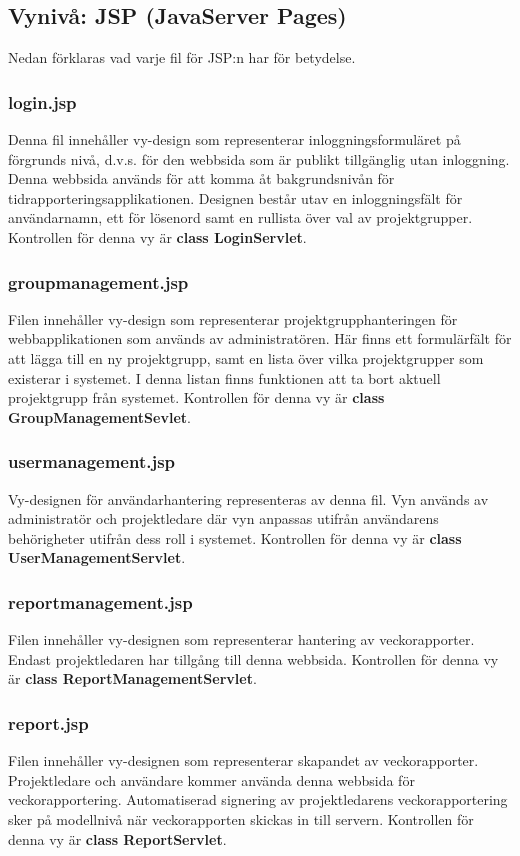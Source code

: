\documentclass[paper=a4, fontsize=11pt,twoside]{article}
\begin{document}
\subsection{Vynivå: JSP (JavaServer Pages)}
Nedan förklaras vad varje fil för JSP:n har för betydelse.
\subsubsection{login.jsp}
Denna fil innehåller vy-design som representerar inloggningsformuläret på förgrunds nivå, d.v.s. för den webbsida som är 		publikt tillgänglig utan inloggning. Denna webbsida används för att komma åt bakgrundsnivån för tidrapporteringsapplikationen. Designen består utav en inloggningsfält för användarnamn, ett för lösenord samt en rullista över val av projektgrupper. Kontrollen för denna vy är \textbf{class LoginServlet}.

\subsubsection{groupmanagement.jsp}
Filen innehåller vy-design som representerar projektgrupphanteringen för webbapplikationen som används av administratören. Här finns ett formulärfält för att lägga till en ny projektgrupp, samt en lista över vilka projektgrupper som existerar  i systemet. I denna listan finns funktionen att ta bort aktuell projektgrupp från systemet. Kontrollen för denna vy är \textbf{class GroupManagementSevlet}.

\subsubsection{usermanagement.jsp}
Vy-designen för användarhantering representeras av denna fil. Vyn används av administratör och projektledare där vyn anpassas utifrån användarens behörigheter utifrån dess roll i systemet. Kontrollen för denna vy är \textbf{class UserManagementServlet}.

\subsubsection{reportmanagement.jsp}
Filen innehåller vy-designen som representerar hantering av veckorapporter. Endast projektledaren har tillgång till denna webbsida. Kontrollen för denna vy är \textbf{class ReportManagementServlet}.

\subsubsection{report.jsp}
Filen innehåller vy-designen som representerar skapandet av veckorapporter. Projektledare och användare kommer använda denna webbsida för veckorapportering. Automatiserad signering av projektledarens veckorapportering sker på modellnivå när veckorapporten skickas in till servern. Kontrollen för denna vy är \textbf{class ReportServlet}.
\end{document}
